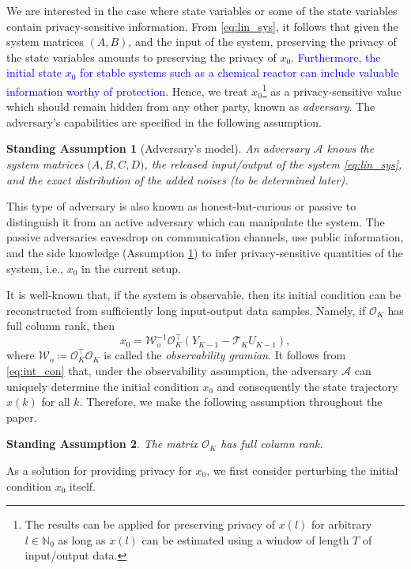 \documentclass{ifacconf}
\newcommand{\calA}{\ensuremath{\mathcal{A}}}
\newcommand{\calO}{\ensuremath{\mathcal{O}}}
\newcommand{\calT}{\ensuremath{\mathcal{T}}}
\newcommand{\calW}{\ensuremath{\mathcal{W}}}
\newcommand{\N}{\ensuremath{\mathbb N}}
\def\be{\begin{equation}}
\def\ee{\end{equation}}
\newcommand{\+}{\mathsmaller{+}}
\newtheorem{assumption}{Standing Assumption}
\newcommand{\blue}[1]{\textcolor{blue}{#1}}
\begin{document}
\par We are interested in the case where state variables or some of the state variables contain privacy-sensitive information. 
From \eqref{eq:lin_sys}, it follows that given the system matrices $(A,B)$, and the input of the system, preserving the privacy of the state variables amounts to preserving the privacy of $x_0$. 
\blue{Furthermore, the initial state $x_0$ for stable systems such as a chemical reactor can include valuable information worthy of protection.}
Hence, we treat $x_0$\footnote{The results can be applied for preserving privacy of $x(l)$ for arbitrary $l \in \N_0$ as long as $x(l)$ can be estimated using a window of length $T$ of input/output data.} as a privacy-sensitive value which should remain hidden from any other party, known as \textit{adversary}. 
The adversary's capabilities are specified in the following assumption.
	\begin{assumption}[Adversary's model]\label{assum:adv}
		An adversary $\calA$ knows the system matrices $\big( A, B, C, D\big)$, the released input/output of the system \eqref{eq:lin_sys}, and the exact distribution of the added noises (to be determined  later). 
	\end{assumption}
This type of adversary is also known as honest-but-curious or passive to distinguish it from an active adversary which can manipulate the system. The passive adversaries eavesdrop on communication channels, use public information, and the side knowledge (Assumption \ref{assum:adv}) to infer privacy-sensitive quantities of the system, i.e., $x_0$ in the current setup. 
\par It is well-known that, if the system is observable, then its initial condition can be reconstructed from sufficiently long input-output data samples. Namely, if $\mathcal{O}_K$ has full column rank, then  {\cite[p. 259]{antsaklis}} 
	\be\label{eq:int_con}
	x_0 = \calW_o^{-1}\calO_K^{\top}(Y_{K-1} - \calT_{K}U_{K-1}), 
	\ee
	where $\calW_o \coloneqq \calO_K^{\top} \calO_K$ is called the \textit{observability gramian}.
%
%
 It follows from  \eqref{eq:int_con} that, under the observability assumption, the adversary $\calA$ can uniquely determine the initial condition $x_0$ and consequently the state trajectory $x(k)$ for all $k$.
Therefore, we make the following assumption throughout the paper.
\begin{assumption}\label{assum:sys_obs}
The matrix $\mathcal{O}_K$ has full column rank.
\end{assumption}
As a solution for providing privacy for $x_0$, we first consider perturbing the initial condition $x_0$ itself. 
\end{document}
